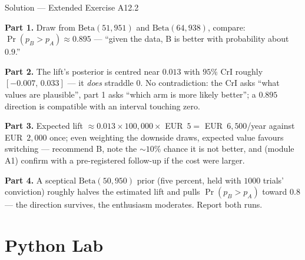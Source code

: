 \documentclass[aspectratio=169,11pt]{beamer}
\begin{document}
\begin{frame}{Solution --- Extended Exercise A12.2}
  \begin{solutionbox}
    \footnotesize
    \textbf{Part 1.} Draw from $\text{Beta}(51, 951)$ and $\text{Beta}(64, 938)$,
    compare: $\Pr(p_B > p_A) \approx \mathbf{0.895}$ --- ``given the data, B is
    better with probability about $0.9$.''
    \par\smallskip
    \textbf{Part 2.} The lift's posterior is centred near $0.013$ with $95\%$ CrI
    roughly $[-0.007,\, 0.033]$ --- it \emph{does} straddle $0$. No contradiction:
    the CrI asks ``what values are plausible'', part 1 asks ``which arm is more
    likely better''; a $0.895$ direction is compatible with an interval touching
    zero.
    \par\smallskip
    \textbf{Part 3.} Expected lift $\approx 0.013 \times 100{,}000 \times$
    EUR~$5 = $ EUR~$6{,}500$/year against EUR~$2{,}000$ once; even weighting
    the downside draws, expected value favours switching --- recommend B, note the
    $\sim 10\%$ chance it is not better, and (module A1) confirm with a
    pre-registered follow-up if the cost were larger.
    \par\smallskip
    \textbf{Part 4.} A sceptical $\text{Beta}(50, 950)$ prior (five percent, held
    with $1000$ trials' conviction) roughly halves the estimated lift and pulls
    $\Pr(p_B > p_A)$ toward $0.8$ --- the direction survives, the enthusiasm
    moderates. Report both runs.
  \end{solutionbox}
\end{frame}

\section{Python Lab}
\end{document}
